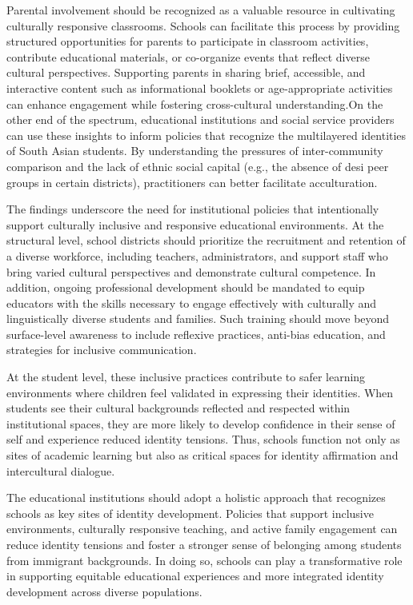 Parental involvement should be recognized as a valuable resource in cultivating culturally responsive classrooms. Schools can facilitate this process by providing structured opportunities for parents to participate in classroom activities, contribute educational materials, or co-organize events that reflect diverse cultural perspectives. Supporting parents in sharing brief, accessible, and interactive content such as informational booklets or age-appropriate activities can enhance engagement while fostering cross-cultural understanding.On the other end of the spectrum, educational institutions and social service providers can use these insights to inform policies that recognize the multilayered identities of South Asian students. By understanding the pressures of inter-community comparison and the lack of ethnic social capital (e.g., the absence of desi peer groups in certain districts), practitioners can better facilitate acculturation.

The findings underscore the need for institutional policies that intentionally support culturally inclusive and responsive educational environments. At the structural level, school districts should prioritize the recruitment and retention of a diverse workforce, including teachers, administrators, and support staff who bring varied cultural perspectives and demonstrate cultural competence. In addition, ongoing professional development should be mandated to equip educators with the skills necessary to engage effectively with culturally and linguistically diverse students and families. Such training should move beyond surface-level awareness to include reflexive practices, anti-bias education, and strategies for inclusive communication.

At the student level, these inclusive practices contribute to safer learning environments where children feel validated in expressing their identities. When students see their cultural backgrounds reflected and respected within institutional spaces, they are more likely to develop confidence in their sense of self and experience reduced identity tensions. Thus, schools function not only as sites of academic learning but also as critical spaces for identity affirmation and intercultural dialogue.

The educational institutions should adopt a holistic approach that recognizes schools as key sites of identity development. Policies that support inclusive environments, culturally responsive teaching, and active family engagement can reduce identity tensions and foster a stronger sense of belonging among students from immigrant backgrounds. In doing so, schools can play a transformative role in supporting equitable educational experiences and more integrated identity development across diverse populations.

